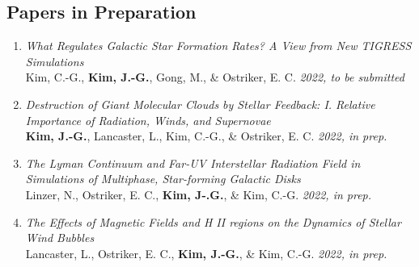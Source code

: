 \subsection{Papers in Preparation}
\begin{enumerate}
\item[] \textit{What Regulates Galactic Star Formation Rates? A View from New
    TIGRESS Simulations} \\ Kim, C.-G., \textbf{Kim, J.-G.}, Gong, M., \& Ostriker,
  E. C. \textit{2022, to be submitted}
\item[] \textit{Destruction of Giant Molecular Clouds by Stellar Feedback: I.
    Relative Importance of Radiation, Winds, and Supernovae} \\ \textbf{Kim,
    J.-G.}, Lancaster, L., Kim, C.-G., \& Ostriker, E. C. \textit{2022, in
    prep.}
\item[] \textit{The Lyman Continuum and Far-UV Interstellar Radiation Field in
    Simulations of Multiphase, Star-forming Galactic Disks} \\ Linzer, N.,
  Ostriker, E. C., \textbf{Kim, J-.G.}, \& Kim, C.-G. \textit{2022, in prep.}
\item[] \textit{The Effects of Magnetic Fields and H II regions on the Dynamics
of Stellar Wind Bubbles} \\ Lancaster, L., Ostriker, E. C.,
  \textbf{Kim, J.-G.}, \& Kim, C.-G. \textit{2022, in prep.}
\end{enumerate}

